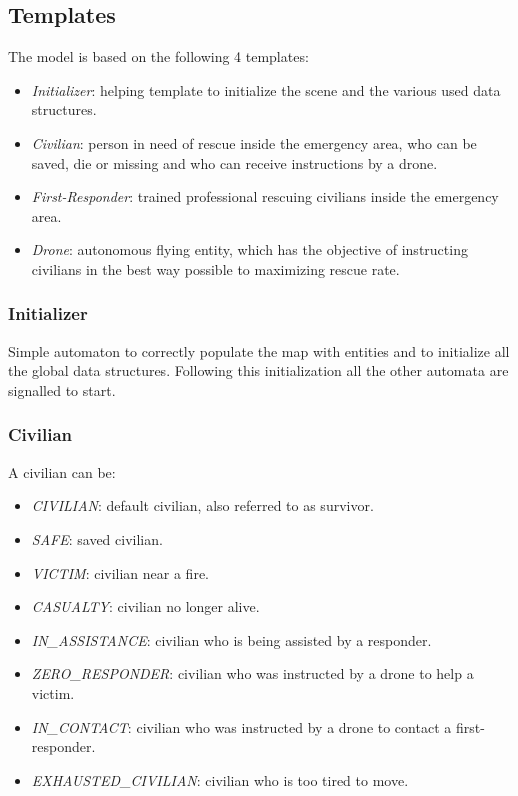 \subsection{Templates}
The model is based on the following 4 templates:
\begin{itemize}
	\item \textit{Initializer}: helping template to initialize the scene and the various used data structures.
	\item \textit{Civilian}: person in need of rescue inside the emergency area, who can be saved, die or missing and who can receive instructions by a drone.
	\item \textit{First-Responder}: trained professional rescuing civilians inside the emergency area.
	\item \textit{Drone}: autonomous flying entity, which has the objective of instructing civilians in the best way possible to maximizing rescue rate.
\end{itemize}


\subsubsection{Initializer}
Simple automaton to correctly populate the map with entities and to initialize all the global data structures. Following this initialization all the other automata are signalled to start.


\subsubsection{Civilian}
A civilian can be:
\begin{itemize}
	\item \textit{CIVILIAN}: default civilian, also referred to as survivor.
	\item \textit{SAFE}: saved civilian.
	\item \textit{VICTIM}: civilian near a fire.
	\item \textit{CASUALTY}: civilian no longer alive.
	\item \textit{IN\_ASSISTANCE}: civilian who is being assisted by a responder.
	\item \textit{ZERO\_RESPONDER}: civilian who was instructed by a drone to help a victim.
	\item \textit{IN\_CONTACT}: civilian who was instructed by a drone to contact a first-responder.
	\item \textit{EXHAUSTED\_CIVILIAN}: civilian who is too tired to move.
\end{itemize}

